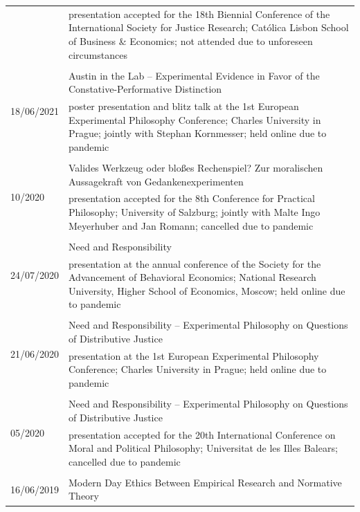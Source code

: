 \documentclass[a4paper,10pt]{article}
\begin{document}
\begin{longtable}{p{2.5cm}p{11cm}}
& \footnotesize{presentation accepted for the 18th Biennial Conference of the International Society for Justice Research; Católica Lisbon School of Business \& Economics; not attended due to unforeseen circumstances}\\
\\
\multirow{2}{2.5cm}{\footnotesize{18/06/2021}} & Austin in the Lab -- Experimental Evidence in Favor of the Constative-Performative Distinction\\
& \footnotesize{poster presentation and blitz talk at the 1st European Experimental Philosophy Conference; Charles University in Prague; jointly with Stephan Kornmesser; held online due to pandemic}\\
\\
\multirow{2}{2.5cm}{\footnotesize{10/2020}} & Valides Werkzeug oder bloßes Rechenspiel? Zur moralischen Aussagekraft von Gedankenexperimenten\\
& \footnotesize{presentation accepted for the 8th Conference for Practical Philosophy; University of Salzburg; jointly with Malte Ingo Meyerhuber and Jan Romann; cancelled due to pandemic}\\
\\
\multirow{2}{2.5cm}{\footnotesize{24/07/2020}} & Need and Responsibility\\
& \footnotesize{presentation at the annual conference of the Society for the Advancement of Behavioral Economics; National Research University, Higher School of Economics, Moscow; held online due to pandemic}\\
\\
\multirow{2}{2.5cm}{\footnotesize{21/06/2020}} & Need and Responsibility -- Experimental Philosophy on Questions of Distributive Justice\\
& \footnotesize{presentation at the 1st European Experimental Philosophy Conference; Charles University in Prague; held online due to pandemic}\\
\\
\multirow{2}{2.5cm}{\footnotesize{05/2020}} & Need and Responsibility -- Experimental Philosophy on Questions of Distributive Justice\\
& \footnotesize{presentation accepted for the 20th International Conference on Moral and Political Philosophy; Universitat de les Illes Balears; cancelled due to pandemic}\\
\\
\multirow{2}{2.5cm}{\footnotesize{16/06/2019}} & Modern Day Ethics Between Empirical Research and Normative Theory\\

\end{longtable}
\end{document}
